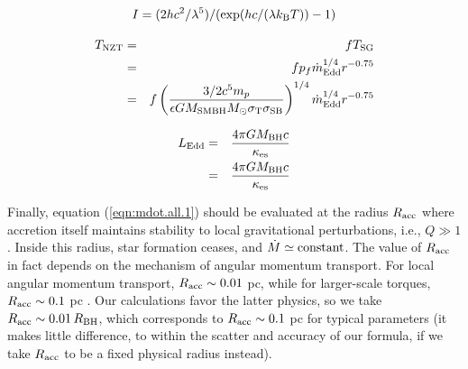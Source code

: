 \documentclass[11pt,a4paper]{article}
\begin{document}
\begin{equation}
    I=(2 h c^{2} / \lambda^{5}) / (\exp(hc/(\lambda k_{\rm B}  T)) -1) 
\end{equation}

\begin{eqnarray}
T_{\rm NZT}    & =  &  f T_{\rm SG}  \\
                   &=  & f p_{f}  \dot{m}_{\rm Edd}^{1/4} r^{-0.75}\\
                   &=  & f   \left ( \frac{3/2 c^{5} m_{p}}{\epsilon G M_{\rm SMBH} M_{\odot} \sigma_{\rm T} \sigma_{\rm SB}}  \right )^{1/4}  \dot{m}_{\rm Edd}^{1/4} r^{-0.75}\\
\end{eqnarray}


\begin{eqnarray}
L_{\rm Edd}     & = &  \frac{4 \pi G M_{\rm BH} c}{\kappa_{\rm es}}  \\ 
                    & = &  \frac{4 \pi G M_{\rm BH} c}{\kappa_{\rm es}}  \\ 
\end{eqnarray}

Finally, equation (\ref{eqn:mdot.all.1}) should be evaluated at the
radius $R_{\rm acc}$ where accretion itself maintains stability to
local gravitational perturbations, i.e., $Q \gg 1$.  Inside this
radius, star formation ceases, and $\dot M \simeq {\rm constant}$. The
value of $R_{\rm acc}$ in fact depends on the mechanism of angular
momentum transport.  For local angular momentum transport, $R_{\rm
acc} \sim 0.01$ pc, while for larger-scale torques, $R_{\rm acc} \sim
0.1$ pc \citep{goodman:qso.disk.selfgrav}.  Our calculations favor the
latter physics, so we take $R_{\rm acc} \sim 0.01 \, R_{\rm BH}$,
which corresponds to $R_{\rm acc} \sim 0.1$ pc for typical parameters
(it makes little difference, to within the scatter and accuracy of our
formula, if we take $R_{\rm acc}$ to be a fixed physical radius
instead).
\end{document}
